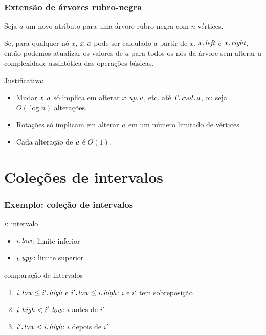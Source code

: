 \documentclass{beamer}
\begin{document}
\begin{frame}
\frametitle{Extensão de árvores rubro-negra}

\begin{theorem}
Seja $a$ um novo atributo para uma árvore rubro-negra com $n$ vértices.

Se, para qualquer nó $x$, $\attrib{x}{a}$ pode ser calculado a partir
de $x$, $\attrib{x}{left}$ e $\attrib{x}{right}$, então podemos 
atualizar os valores de $a$ para todos os nós da árvore sem alterar
a complexidade assintótica das operações básicas.
\end{theorem}

\pause

\alert{Justificativa}: 
\begin{itemize}
\item Mudar $\attrib{x}{a}$ só implica em alterar
$\attrib{\attrib{x}{up}}{a}$, etc. até $\attrib{\attrib{T}{root}}{a}$, ou seja $O(\log n)$ alterações.

\item Rotações só implicam em alterar $\id{a}$ em um número limitado de vértices.

\item Cada alteração de $\id{a}$ é $O(1)$.
\end{itemize}

\end{frame}

\section{Coleções de intervalos}

\begin{frame}
\frametitle{Exemplo: coleção de intervalos}

$i$: intervalo 
\begin{itemize}
\item $\attrib{i}{low}$: limite inferior
\item $\attrib{i}{upp}$: limite superior
\end{itemize}

comparação de intervalos
\begin{enumerate}
\item $\attrib{i}{low} \le \attrib{i'}{high}$ e $\attrib{i'}{low} \le \attrib{i}{high}$: $i$ e $i'$ tem sobreposição
\item $\attrib{i}{high} < \attrib{i'}{low}$: $i$ antes de $i'$
\item $\attrib{i'}{low} < \attrib{i}{high}$: $i$ depois de $i'$
\end{enumerate}

\end{frame}
\end{document}
